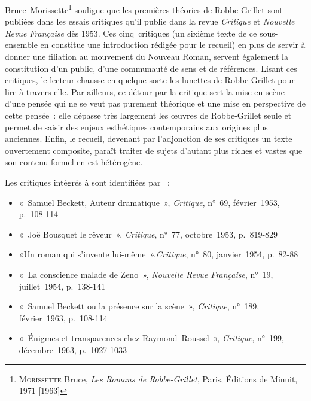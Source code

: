 \documentclass[12pt, a4paper]{article}
\begin{document}
Bruce~Morissette\footnote{\textsc{Morissette} Bruce, \textit{Les Romans de Robbe-Grillet}, Paris, Éditions de Minuit, 1971 [1963]} souligne que les premières théories de Robbe-Grillet sont publiées dans les essais critiques qu'il publie dans la revue \textit{Critique} et \textit{Nouvelle Revue Française} dès 1953. Ces cinq~critiques (un sixième texte de ce sous-ensemble en constitue une introduction rédigée pour le recueil) en plus de servir à donner une filiation au mouvement du Nouveau Roman, servent également la constitution d'un public, d'une communauté de sens et de références. Lisant ces critiques, le lecteur chausse en quelque sorte les lunettes de Robbe-Grillet pour lire à travers elle. Par ailleurs, ce détour par la critique sert la mise en scène d'une pensée qui ne se veut pas purement théorique et une mise en perspective de cette pensée~: elle dépasse très largement les œuvres de Robbe-Grillet seule et permet de saisir des enjeux esthétiques contemporains aux origines plus anciennes. Enfin, le recueil, devenant par l'adjonction de ses critiques un texte ouvertement composite, paraît traiter de sujets d'autant plus riches et vastes que son contenu formel en est hétérogène.

Les critiques intégrés à \punr{} sont identifiées par \galia~:
\begin{itemize}
    \item «~Samuel Beckett, Auteur dramatique~», \textit{Critique}, n°~69, février~1953, p.~108-114
    \item «~Joë Bousquet le rêveur~», \textit{Critique}, n°~77, octobre~1953, p.~819-829
    \item «Un roman qui s'invente lui-même~»,\textit{Critique}, n°~80, janvier~1954, p.~82-88
    \item «~La conscience malade de Zeno~», \textit{Nouvelle Revue Française}, n°~19, juillet~1954, p.~138-141
    \item «~Samuel Beckett ou la présence sur la scène~», \textit{Critique}, n°~189, février~1963, p.~108-114
    \item «~Énigmes et transparences chez Raymond~Roussel~», \textit{Critique}, n°~199, décembre~1963, p.~1027-1033
\end{itemize}
\end{document}
